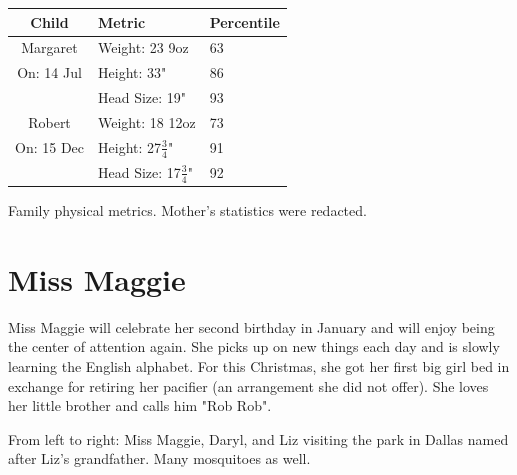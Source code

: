 \documentclass{article}
\makeatletter
\newenvironment{tablehere}
  {\def\@captype{table}}
  {}
\newenvironment{figurehere}
  {\def\@captype{figure}}
  {}
\makeatother
\begin{document}
\begin{multicols}{2}
\begin{tablehere}
 \begin{center}
  \begin{tabular}{|c|l|l|}
   \multicolumn{1}{c}{Child} &
   \multicolumn{1}{l}{Metric} &
   \multicolumn{1}{l}{Percentile} \\ \hline \hline
   Margaret & Weight: 23 9oz & 63 \\
   On: 14 Jul & Height: 33" & 86 \\
    & Head Size: 19" & 93 \\
   Robert & Weight: 18 12oz & 73 \\
   On: 15 Dec & Height: 27$\frac{3}{4}$" & 91 \\
    & Head Size: 17$\frac{3}{4}$" & 92 \\
\hline
  \end{tabular}
 \end{center}
 \caption{Family physical metrics. Mother's statistics were redacted.}
 \label{table:timeline}
\end{tablehere}


\section{Miss Maggie}

Miss Maggie will celebrate her second birthday in January and will enjoy 
being the center of attention again.  She picks up on new things each day 
and is slowly learning the English alphabet.  For this Christmas, she got 
her first big girl bed in exchange for retiring her pacifier (an 
arrangement she did not offer).  She loves her little brother and calls 
him "Rob Rob".


\bigskip
\begin{figurehere}
 \centering   
 \caption{From left to right: Miss Maggie, Daryl, and Liz visiting the park
in Dallas named after Liz's grandfather. Many mosquitoes as well.}
\end{figurehere}


\end{multicols}
\end{document}
